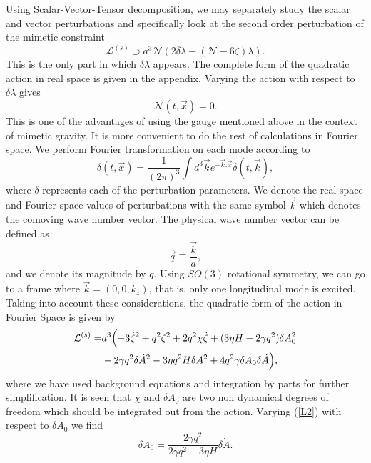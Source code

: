 \documentclass[%
 reprint,
 amsmath,amssymb,
 aps,
]{revtex4-1}
\begin{document}
Using Scalar-Vector-Tensor decomposition, we may separately study the scalar and vector perturbations and specifically look  at the second order perturbation of the mimetic constraint
\begin{equation}
\mathcal{L}^{(s)}\supset a^3\mathcal{N}(2\delta\lambda-(\mathcal{N}-6\zeta)\lambda).
\end{equation}
This is the only part in which $\delta \lambda$ appears. The complete form of the quadratic action in real space is given in the appendix. Varying the action with respect to $\delta \lambda$ gives
\begin{equation}
\mathcal{N}(t,\vec{x})=0.
\end{equation}
This is one of the advantages of using the gauge mentioned above in the context of mimetic gravity. It is more convenient to do the rest of calculations in Fourier space. We perform Fourier transformation on each mode according to
\begin{equation}
\delta(t,\vec{x}) = \frac{1}{(2\pi)^3}\int d^3\vec{k}e^{-\vec{k}.\vec{x}}\delta(t,\vec{k}),
\end{equation}
where $\delta$ represents each of the perturbation parameters. We denote the real space and Fourier space values of perturbations with the same symbol $\vec{k}$ which denotes the comoving wave number vector. The physical wave number vector can be defined as
\begin{equation}
\vec{q}\equiv \frac{\vec{k}}{a},
\end{equation}
and we denote its magnitude by $q$. Using $SO(3)$ rotational symmetry, we can go to a frame where $\vec{k}=(0,0,k_z)$, that is, only one longitudinal mode is excited. Taking into account these considerations, the quadratic form of the action  in Fourier Space is given by
\begin{equation}\label{L2}
\begin{split}
\mathcal{L}^{(s)}=& a^3\Bigl(-3\dot{\zeta}^2+q^2\zeta^2+2q^2\chi\dot{\zeta}+(3\eta H-2\gamma q^2)\delta A_0^2\\
&-2\gamma q^2\delta\dot{A}^2-3\eta q^2 H\delta A^2+4q^2 \gamma\delta A_0\delta\dot{A}\Bigr),
\end{split}
\end{equation}
where we have used background equations and integration by parts for further simplification. It is seen that $\chi$ and $\delta A_0$ are two non dynamical degrees of freedom which should be integrated out from the action. Varying (\ref{L2}) with respect to $\delta A_0$ we find
\begin{equation}
\delta A_0=\frac{2\gamma q^2}{2\gamma q^2-3\eta H}\delta\dot{A}.
\end{equation}
\end{document}
